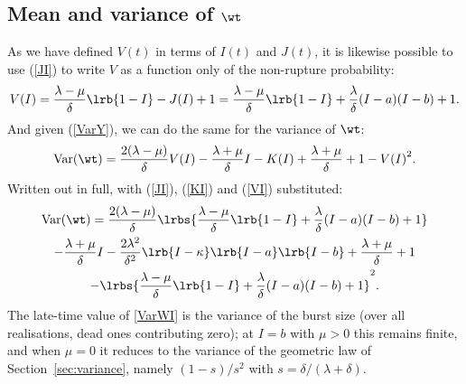 \subsection{Mean and variance of $\wt$}

As we have defined $V(t)$ in terms of $I(t)$ and $J(t)$, it is likewise
possible to use (\ref{JI}) to write $V$ as a function only of the non-rupture
probability:
\begin{equation}
\label{VI}
V(I) = \frac{\lambda - \mu}{\delta}\lrb{1-I} - J(I) + 1
= \frac{\lambda - \mu}{\delta}\lrb{1-I} + \frac{\lambda}{\delta} (I - a)(I-b) + 1.
\end{equation}
And given (\ref{VarY}), we can do the same for the variance of $\wt$:
\begin{equation}
\label{VarWI}
\text{Var}(\wt) = \frac{2(\lambda-\mu)}{\delta} V(I) - \frac{\lambda+\mu}{\delta}I - K(I) + \frac{\lambda+\mu}{\delta} + 1 - {V(I)}^2.
\end{equation}
Written out in full, with (\ref{JI}), (\ref{KI}) and (\ref{VI}) substituted:
\begin{multline*}
\text{Var}(\wt) = \frac{2(\lambda - \mu)}{\delta} \lrbs{ \frac{\lambda - \mu}{\delta}\lrb{1-I} + \frac{\lambda}{\delta} (I - a)(I-b) + 1} \\
- \frac{\lambda+\mu}{\delta} I
-\frac{2\lambda^2}{\delta^2}\lrb{I-\kappa}\lrb{I-a}\lrb{I-b}
+ \frac{\lambda + \mu}{\delta} + 1 \\ - \lrbs{\frac{\lambda - \mu}{\delta}\lrb{1-I} + \frac{\lambda}{\delta} (I - a)(I-b) + 1}^2.
\end{multline*}
The late-time value of \eqref{VarWI} is the variance of the burst size (over
all realisations, dead ones contributing zero); at $I=b$ with $\mu>0$ this
remains finite, and when $\mu=0$ it reduces to the variance of the geometric
law of Section~\ref{sec:variance}, namely $(1-s)/s^2$ with
$s=\delta/(\lambda+\delta)$.

